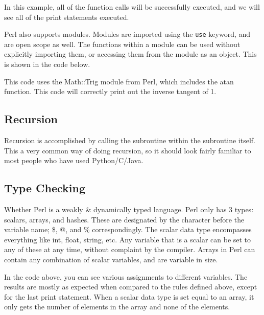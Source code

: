 \documentclass[12pt]{article}
\newcommand{\li}[1]{\lstinline{#1}} %
\begin{document}
	
	
	In this example, all of the function calls will be successfully executed, and we will see all of the print statements executed.
	
	Perl also supports modules. Modules are imported using the \li{use} keyword, and are open scope as well. The functions within a module can be used without explicitly importing them, or accessing them from the module as an object. This is shown in the code below.
	
	
	
	This code uses the Math::Trig module from Perl, which includes the atan function. This code will correctly print out the inverse tangent of 1.
	
	\subsection{Recursion}
	
	Recursion is accomplished by calling the subroutine within the subroutine itself. This a very common way of doing recursion, so it should look fairly familiar to most people who have used Python/C/Java.
	
	
	
	\subsection{Type Checking}
	
	Whether Perl is a weakly \& dynamically typed language. Perl only has 3 types: scalars, arrays, and hashes\cite{perldocs}. These are designated by the character before the variable name; \$, @, and \% correspondingly. The scalar data type encompasses everything like int, float, string, etc. Any variable that is a scalar can be set to any of these at any time, without complaint by the compiler. Arrays in Perl can contain any combination of scalar variables, and are variable in size.
	
	
	
	In the code above, you can see various assignments to different variables. The results are mostly as expected when compared to the rules defined above, except for the last print statement. When a scalar data type is set equal to an array, it only gets the number of elements in the array and none of the elements.
	
\end{document}
